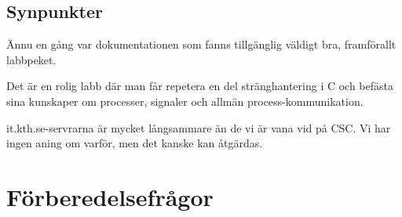 \documentclass[paper=a4, fontsize=11pt]{scrartcl} %
\numberwithin{equation}{section} %
\numberwithin{figure}{section} %
\numberwithin{table}{section} %
\begin{document}
\subsection{Synpunkter}
Ännu en gång var dokumentationen som fanns tillgänglig väldigt bra, framförallt labbpeket.

Det är en rolig labb där man får repetera en del stränghantering i C 
och befästa sina kunskaper om processer, signaler och allmän process-kommunikation.

it.kth.se-servrarna är mycket långsammare än de vi är vana vid på CSC.
Vi har ingen aning om varför, men det kanske kan åtgärdas.




\section{Förberedelsefrågor}
\end{document}

